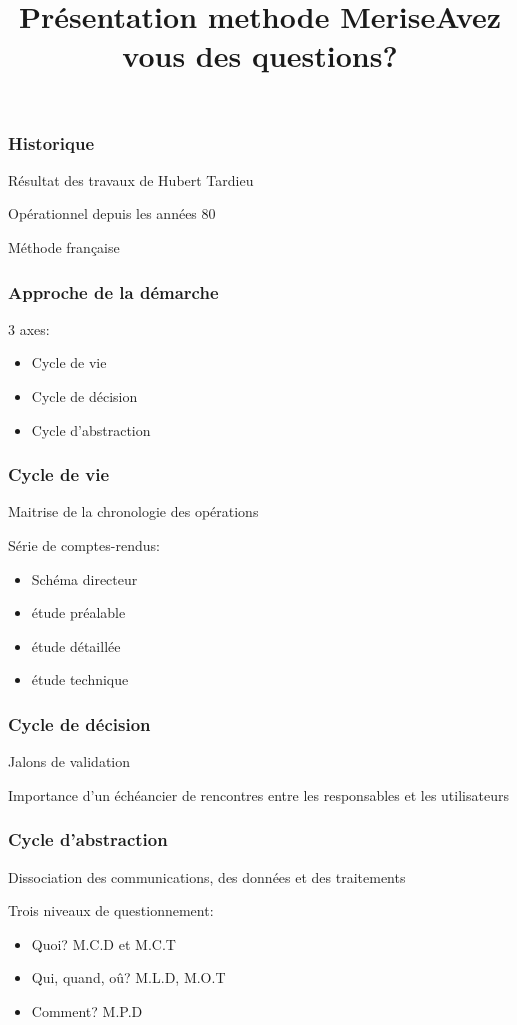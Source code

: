 \documentclass{beamer}
\title{Présentation methode Merise}
\institute{Ynov Bordeaux}
\begin{document}
\begin{frame}
\titlepage
\end{frame}


\begin{frame}
\frametitle{Historique}
Résultat des travaux de Hubert Tardieu

Opérationnel depuis les années 80

Méthode française
\end{frame}

\begin{frame}
\frametitle{Approche de la démarche}
3 axes:
\begin{itemize}
    \item Cycle de vie 
    \item Cycle de décision 
    \item Cycle d'abstraction
\end{itemize}
\end{frame}
\begin{frame}
\frametitle{Cycle de vie}

Maitrise de la chronologie des opérations

Série de comptes-rendus:

\begin{itemize}
    \item Schéma directeur
    \item étude préalable
    \item étude détaillée
    \item étude technique
\end{itemize}
\end{frame}

\begin{frame}
\frametitle{Cycle de décision}
Jalons de validation

Importance d'un échéancier de rencontres entre les responsables et les utilisateurs
\end{frame}

\begin{frame}
\frametitle{Cycle d'abstraction}
Dissociation des communications, des données et des traitements

Trois niveaux de questionnement:
\begin{itemize}
    \item Quoi? M.C.D et M.C.T
    \item Qui, quand, oû? M.L.D, M.O.T
    \item Comment? M.P.D
\end{itemize}

\end{frame}
\begin{frame}
\title{Avez vous des questions?}
\titlepage
\end{frame}
\end{document}
